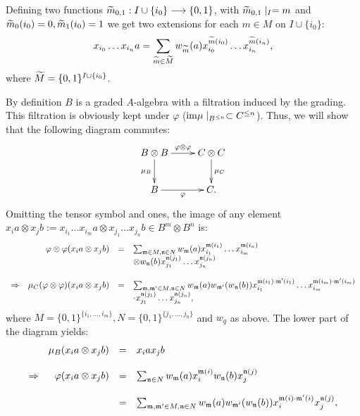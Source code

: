 Defining two functions $\widetilde{m}_{0,1} : I \cup \{i_0\} \longrightarrow \{0,1\}$, with $\widetilde{m}_{0,1}\mid_I = m$ and $\widetilde{m}_0(i_0) = 0, \widetilde{m}_1(i_0) = 1$ we get two extensions for each $m \in M$ on $I \cup \{i_0\}$:
\begin{align} 
x_{i_0} \ldots x_{i_n} a &= \sum_{\widetilde{m} \in \widetilde{M}} w_{\widetilde{m}} (a) x_{i_0}^{\widetilde{m}(i_0)} \ldots x_{i_n}^{\widetilde{m}(i_n)},\\
\end{align}
where $\widetilde{M} = \{0,1\}^{I \cup \{i_0\}}$.
\item By definition $B$ is a graded $A$-algebra with a filtration induced by the grading. This filtration is obviously kept under $\varphi$ ($\mathrm{im} \mu\mid_{B^{\leq n}} \subset C^{\leq n}$). Thus, we will show that the following diagram commutes:
$$\xymatrix{
B \otimes B \ar[d]_{\mu_B}\ar[r]^{\varphi \otimes \varphi} & C \otimes C\ar[d]^{\mu_C} \\
B \ar[r]_{\varphi} & C.\\
}$$
\newcommand{\mmap}{\mathfrak{m}}
\newcommand{\nmap}{\mathfrak{n}}
Omitting the tensor symbol and ones, the image of any element $x_i a \otimes x_j b := x_{i_1} \ldots x_{i_m} a \otimes x_{j_1} \ldots x_{j_n} b \in B^m \otimes B^n$ is:
$$\bao{rrcl}
&\varphi \otimes \varphi(x_i a \otimes x_j b) &=& \sum_{\mmap \in M, \nmap \in N} w_\mmap(a) x_{i_1}^{\mmap(i_1)} \ldots x_{i_m}^{\mmap(i_n)}\\
&&& \otimes w_\nmap(b) x_{j_1}^{\nmap(j_1)} \ldots x_{j_n}^{\nmap(j_n)}\\
&&&\\
\RA&\mu_C(\varphi \otimes \varphi)(x_i a \otimes x_j b) &=& \sum_{\mmap, \mmap' \in M, \nmap\in N} w_\mmap(a) w_{\mmap'}(w_\nmap(b)) x_{i_1}^{\mmap(i_1) \cdot \mmap'(i_1)} \ldots x_{i_m}^{\mmap(i_m) \cdot\mmap'(i_m)}\\
&&&\cdot x_{j_1}^{\nmap(j_1)} \ldots x_{j_n}^{\nmap(j_n)},\\
\ea$$
where $M = \{0,1\}^{\{i_1,\ldots,i_m\}}, N = \{0,1\}^{\{j_1,\ldots,j_n\}}$ and $w_q$ as above. The lower part of the diagram yields:
$$\bao{rrcl}
&\mu_B(x_i a \otimes x_j b) &=& x_i a x_j b\\
&&&\\
\RA&\varphi(x_i a \otimes x_j b) &=& \sum_{\nmap \in N} w_\mmap(a) x_i^{\mmap(i)} w_\nmap(b) x_j^{\nmap(j)}\\
&&&\\
&&=& \sum_{\mmap, \mmap' \in M, \nmap \in N} w_\mmap(a) w_{\mmap'}(w_\nmap(b)) x_i^{\mmap(i) \cdot \mmap'(i)} x_j^{\nmap(j)},\\
\ea$$
